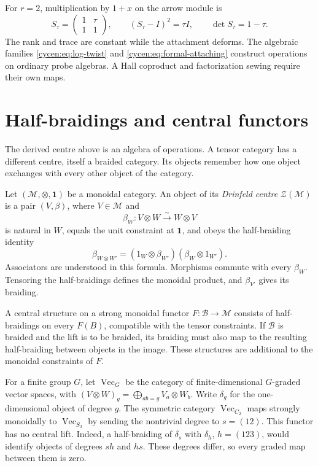 For $r=2$, multiplication by $1+x$ on the arrow module is
\[
 S_\tau=\begin{pmatrix}1&\tau\\1&1\end{pmatrix},\qquad
 (S_\tau-I)^2=\tau I,
 \qquad \det S_\tau=1-\tau.
\]
The rank and trace are constant while the attachment deforms.
The algebraic families \eqref{cycen:eq:log-twist} and
\eqref{cycen:eq:formal-attaching} construct operations on
ordinary probe algebras. A Hall coproduct and factorization
sewing require their own maps.

\section{Half-braidings and central functors}
\label{cycen:sec:categorical}

The derived centre above is an algebra of operations. A
tensor category has a different centre, itself a braided
category. Its objects remember how one object exchanges
with every other object of the category.

Let $(\mathscr M,\otimes,\mathbf1)$ be a monoidal category.
An object of its \emph{Drinfeld centre} $\mathcal Z(\mathscr M)$
is a pair $(V,\beta)$, where $V\in\mathscr M$ and
\[
 \beta_W:V\otimes W\xrightarrow{\sim}W\otimes V
\]
is natural in $W$, equals the unit constraint at $\mathbf1$,
and obeys the half-braiding identity
\[
 \beta_{W\otimes W'}
   =(1_W\otimes\beta_{W'})(\beta_W\otimes1_{W'}).
\]
Associators are understood in this formula. Morphisms commute
with every $\beta_W$. Tensoring the half-braidings defines
the monoidal product, and $\beta_{V'}$ gives its braiding.

A central structure on a strong monoidal functor
$F:\mathscr B\to\mathscr M$ consists of half-braidings
on every $F(B)$, compatible with the tensor constraints.
If $\mathscr B$ is braided and the lift is to be braided,
its braiding must also map to the resulting half-braiding
between objects in the image. These structures are additional
to the monoidal constraints of $F$.

\begin{example}\label{cycen:ex:no-central-lift}
For a finite group $G$, let $\operatorname{Vec}_G$ be the
category of finite-dimensional $G$-graded vector spaces,
with $(V\otimes W)_g=\bigoplus_{ab=g}V_a\otimes W_b$.
Write $\delta_g$ for the one-dimensional object of degree $g$.
The symmetric category $\operatorname{Vec}_{C_2}$ maps
strongly monoidally to $\operatorname{Vec}_{S_3}$ by sending
the nontrivial degree to $s=(12)$. This functor has no
central lift. Indeed, a half-braiding of $\delta_s$ with
$\delta_h$, $h=(123)$, would identify objects of degrees
$sh$ and $hs$. These degrees differ, so every graded map
between them is zero.
\end{example}

